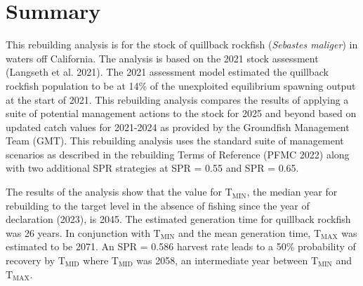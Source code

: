 \documentclass[11pt,
  letterpaper,
]{article}
\begin{document}
\pagestyle{plain}  %
\renewcommand*{\thefootnote}{\arabic{footnote}}  %
\setcounter{footnote}{0}  %
\renewcommand{\headrulewidth}{0.5pt}
\renewcommand{\footrulewidth}{0.5pt}

\newcommand{\lt}{\ensuremath <}
\newcommand{\gt}{\ensuremath >}

\pagebreak
{}
\setcounter{page}{1}

\renewcommand{\thetable}{\roman{table}}
\renewcommand{\thefigure}{\roman{figure}}

\setlength\parskip{0.5em plus 0.1em minus 0.2em}

\pagebreak

\hypertarget{summary}{%
\section*{Summary}\label{summary}}

This rebuilding analysis is for the stock of quillback rockfish (\emph{Sebastes maliger}) in waters off California. The analysis is based on the 2021 stock assessment (Langseth et al. 2021). The 2021 assessment model estimated the quillback rockfish population to be at 14\% of the unexploited equilibrium spawning output at the start of 2021. This rebuilding analysis compares the results of applying a suite of potential management actions to the stock for 2025 and beyond based on updated catch values for 2021-2024 as provided by the Groundfish Management Team (GMT). This rebuilding analysis uses the standard suite of management scenarios as described in the rebuilding Terms of Reference (PFMC 2022) along with two additional SPR strategies at SPR = 0.55 and SPR = 0.65.

The results of the analysis show that the value for \(\text{T}_\text{MIN}\), the median year for rebuilding to the target level in the absence of fishing since the year of declaration (2023), is 2045. The estimated generation time for quillback rockfish was 26 years. In conjunction with \(\text{T}_\text{MIN}\) and the mean generation time, \(\text{T}_\text{MAX}\) was estimated to be 2071. An SPR = 0.586 harvest rate leads to a 50\% probability of recovery by \(\text{T}_\text{MID}\) where \(\text{T}_\text{MID}\) was 2058, an intermediate year between \(\text{T}_\text{MIN}\) and \(\text{T}_\text{MAX}\).
\end{document}
